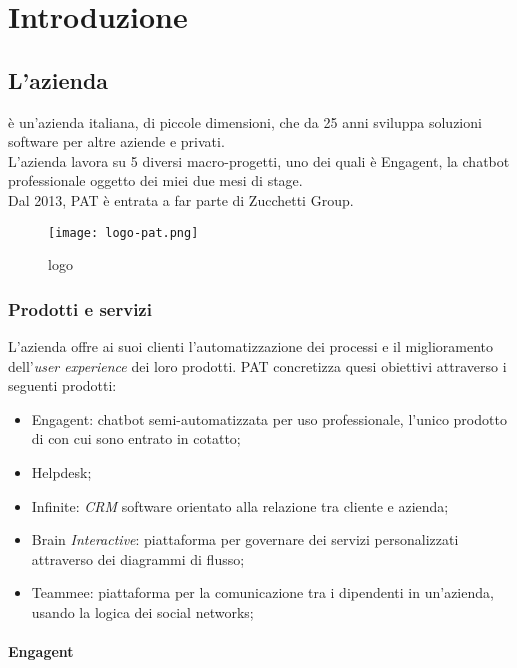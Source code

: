 
\chapter{Introduzione}
\label{cap:introduzione}
\section{L'azienda}

\company{} è un'azienda italiana, di piccole dimensioni, che da 25 anni sviluppa soluzioni software per altre aziende e privati.\\
L'azienda lavora su 5 diversi macro-progetti, uno dei quali è Engagent, la chatbot professionale oggetto dei miei due mesi di stage.\\
Dal 2013, PAT è entrata a far parte di Zucchetti Group.
\begin{figure}[H]
    \centering
    \texttt{[image: logo-pat.png]} 
    \caption{logo \company{}}
    \label{logo:company}
\end{figure}

\subsection{Prodotti e servizi}
L'azienda offre ai suoi clienti l'automatizzazione dei processi e il miglioramento dell'\textit{user experience} dei loro prodotti.
PAT concretizza quesi obiettivi attraverso i seguenti prodotti:
\begin{itemize}
    \item Engagent: chatbot semi-automatizzata per uso professionale, l'unico prodotto di \company{} con cui sono entrato in cotatto; 
    \item Helpdesk;
    \item Infinite: \textit{CRM} software orientato alla relazione tra cliente e azienda;
    \item Brain \textit{Interactive}: piattaforma per governare dei servizi personalizzati attraverso dei diagrammi di flusso; 
    \item Teammee: piattaforma per la comunicazione tra i dipendenti in un'azienda, usando la logica dei social networks;
\end{itemize}

\subsubsection{Engagent}


